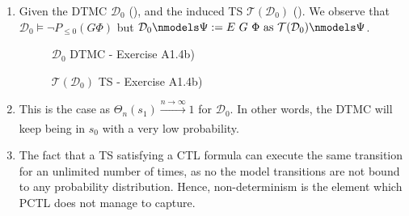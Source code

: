 \documentclass{report}
\begin{document}
\begin{enumerate}
\begin{enumerate}
    \item Given the DTMC $\mathcal{D}_{0}$ (), and the induced TS $\mathcal{T}(\mathcal{D}_{0})$ (). We observe that $\mathcal{D}_{0} \models \neg P_{\leq 0}(G \Phi)$ but $\mathcal{D}_{0} \nmodels \Psi:= E\ G\ \Phi \ \text{as} \ \mathcal{T}(\mathcal{D}_{0}) \nmodels \Psi$.

      \begin{figure}[h!]
      \centering
      \caption{$\mathcal{D}_{0}$ DTMC - Exercise A1.4b)} \label{fig:A14b-dtmc}
    \end{figure}

      \begin{figure}[h!]
      \centering
      \caption{$\mathcal{T}(\mathcal{D}_{0})$ TS - Exercise A1.4b)} \label{fig:A14b-ts}
    \end{figure}
  \item This is the case as $\Theta_{n}(s_{1}) \xrightarrow[]{n \rightarrow \infty}1 $ for  $\mathcal{D}_{0}$. In other words, the DTMC will keep being in $s_{0}$ with a very low probability.
    \item The fact that a TS satisfying a CTL formula can execute the same transition for an unlimited number of times, as no the model transitions are not bound to any probability distribution. Hence, non-determinism is the element which PCTL does not manage to capture.
  \end{enumerate}
\end{enumerate}
\end{document}
